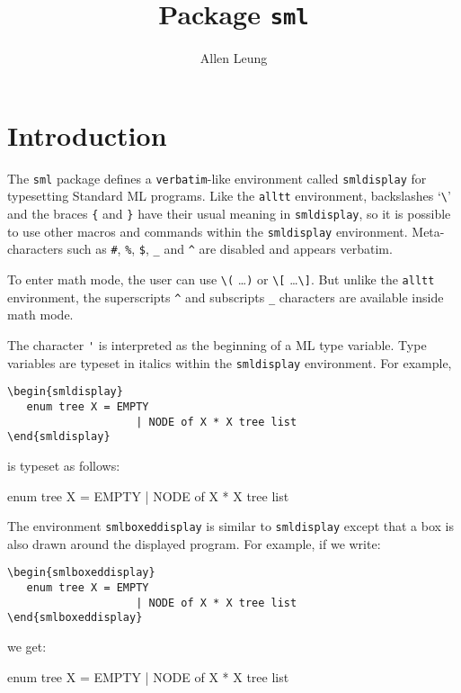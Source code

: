\documentclass{article}
\title{Package {\tt sml}}
\author{Allen Leung}
\begin{document}
  \maketitle
\section{Introduction}
  The \verb|sml| package defines a \verb|verbatim|-like environment
called \verb|smldisplay|
for typesetting Standard ML programs.   
Like the \verb|alltt| environment, 
backslashes `\verb|\|' and the braces \verb|{|
and \verb|}| have their usual meaning in \verb|smldisplay|, 
so it is possible to use other
macros and commands within the \verb|smldisplay| environment.
Meta-characters such as \verb|#|, \verb|%|, 
\verb|$|, \verb|_| and \verb|^| are disabled and appears verbatim.  

To enter math mode, the user can use \verb|\(| \ldots \verb|)| or
\verb|\[| \ldots \verb|\]|.  But unlike the \verb|alltt| environment,
the superscripts \verb|^| and subscripts \verb|_| characters
are available inside math mode. 

The character \verb|'| is interpreted as the beginning of a ML 
type variable.  Type variables are typeset 
in italics within the \verb|smldisplay| environment.  For example, 
\begin{verbatim}
\begin{smldisplay} 
   enum tree X = EMPTY
                    | NODE of X * X tree list
\end{smldisplay}
\end{verbatim}
is typeset as follows:
\begin{smldisplay} 
   enum tree X = EMPTY 
                    | NODE of X * X tree list
\end{smldisplay}

The environment \verb|smlboxeddisplay| is similar to \verb|smldisplay|
except that a box is also drawn around the displayed program.
For example, if we write:
\begin{verbatim}
\begin{smlboxeddisplay} 
   enum tree X = EMPTY 
                    | NODE of X * X tree list
\end{smlboxeddisplay}
\end{verbatim}
we get:
\begin{smlboxeddisplay} 
   enum tree X = EMPTY 
                    | NODE of X * X tree list
\end{smlboxeddisplay}
\end{document}
